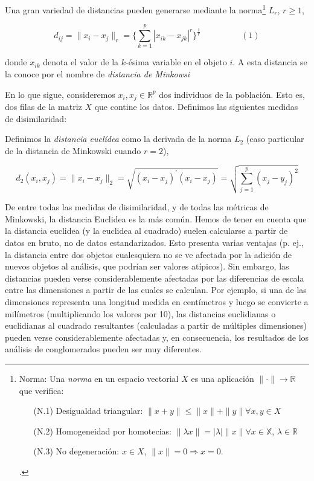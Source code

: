 Una gran variedad de distancias pueden generarse mediante la norma\footnote[10]{Norma: Una \textit{norma} en un espacio vectorial $X$ es una aplicación $\|\cdot\| \rightarrow \mathbb{R}$ que verifica:
\begin{itemize}
    \item[(N.1)] Desigualdad triangular: $\|x+y\| \leq \|x\| + \|y\| \forall x,y \in X$
    \item[(N.2)] Homogeneidad por homotecias: $\|\lambda x\| = |\lambda| \|x\| \forall x \in \mathbb{X}$, $\lambda \in \mathbb{R}$
    \item[(N.3)] No degeneración: $x \in X$, $\|x\| = 0 \Rightarrow x = 0$. \cite{def-norma}  
\end{itemize}.} $L_{r}$, $r \geq 1$, 


\[
d_{ij} = \|x_{i} - x_{j}\|_{r} = \{\sum_{k=1}^{p} |x_{ik}-x_{jk}|^{r}\}^{\frac{1}{r}} \hspace{2cm} (1)
\]

donde $x_{ik}$ denota el valor de la $k$-ésima variable en el objeto $i$. A esta distancia se la conoce por el nombre de \textit{distancia de Minkowsi}\newline

En lo que sigue, consideremos $x_{i}, x_{j} \in \mathbb{R}^{p}$ dos individuos de la población. Esto es, dos filas de la matriz $X$ que contine los datos. 
Definimos las siguientes medidas de disimilaridad:

\begin{definicion}

Definimos la \textit{distancia euclídea} como la derivada de la norma $L_{2}$ (caso particular de la distancia de Minkowski cuando $r=2$), 

\[
d_{2}(x_{i},x_{j}) = \|x_{i} - x_{j}\|_{2} = \sqrt{(x_{i}-x_{j})^{'}(x_{i}-x_{j})} = \sqrt{\sum_{j=1}^{p}(x_{j}-y_{j})^{2}}
\] 

\end{definicion}


De entre todas las medidas de disimilaridad, y de todas las métricas de Minkowski, la distancia Euclidea es la más común. Hemos de tener en cuenta que la 
distancia euclidea (y la euclidea al cuadrado) suelen calcularse a partir de datos en bruto, 
no de datos estandarizados. Esto presenta varias ventajas (p. ej., la distancia entre dos objetos cualesquiera no se ve afectada por la adición de nuevos objetos 
al análisis, que podrían ser valores atípicos). Sin embargo, las distancias pueden verse considerablemente afectadas por las diferencias de escala entre las 
dimensiones a partir de las cuales se calculan.  Por ejemplo, si una de las dimensiones representa una longitud medida en centímetros y luego se convierte a milímetros (multiplicando los 
valores por 10), las distancias euclidianas o euclidianas al cuadrado resultantes (calculadas a partir de múltiples dimensiones) pueden verse considerablemente 
afectadas y, en consecuencia, los resultados de los análisis de conglomerados pueden ser muy diferentes. \newline



